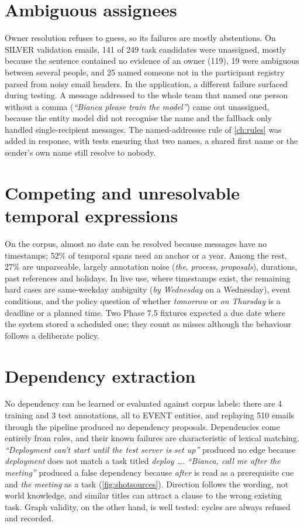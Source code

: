 \section{Ambiguous assignees}
Owner resolution refuses to guess, so its failures are mostly abstentions. On SILVER validation emails, 141 of 249 task candidates were unassigned, mostly because the sentence contained no evidence of an owner (119), 19 were ambiguous between several people, and 25 named someone not in the participant registry parsed from noisy email headers. In the application, a different failure surfaced during testing. A message addressed to the whole team that named one person without a comma (\emph{``Bianca please train the model''}) came out unassigned, because the entity model did not recognise the name and the fallback only handled single-recipient messages. The named-addressee rule of \cref{ch:rules} was added in response, with tests ensuring that two names, a shared first name or the sender's own name still resolve to nobody.

\section{Competing and unresolvable temporal expressions}
On the corpus, almost no date can be resolved because messages have no timestamps; 52\% of temporal spans need an anchor or a year. Among the rest, 27\% are unparseable, largely annotation noise (\emph{the}, \emph{process}, \emph{proposals}), durations, past references and holidays. In live use, where timestamps exist, the remaining hard cases are same-weekday ambiguity (\emph{by Wednesday} on a Wednesday), event conditions, and the policy question of whether \emph{tomorrow} or \emph{on Thursday} is a deadline or a planned time. Two Phase 7.5 fixtures expected a due date where the system stored a scheduled one; they count as misses although the behaviour follows a deliberate policy.

\section{Dependency extraction}
No dependency can be learned or evaluated against corpus labels: there are 4 training and 3 test  annotations, all to EVENT entities, and replaying 510 emails through the pipeline produced no dependency proposals. Dependencies come entirely from rules, and their known failures are characteristic of lexical matching. \emph{``Deployment can't start until the test server is set up''} produced no edge because \emph{deployment} does not match a task titled \emph{deploy \ldots}. \emph{``Bianca, call me after the meeting''} produced a false dependency because \emph{after} is read as a prerequisite cue and \emph{the meeting} as a task (\cref{fig:shotsources}). Direction follows the wording, not world knowledge, and similar titles can attract a clause to the wrong existing task. Graph validity, on the other hand, is well tested: cycles are always refused and recorded.

